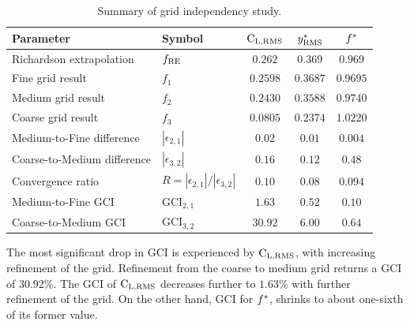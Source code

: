 \documentclass[oneside]{utmthesis}
\begin{document}
\begin{table}[!ht]
\centering
\caption{Summary of grid independency study.} \label{tab:gridIndependency}
\vspace{\baselineskip}
\setlength{\tabcolsep}{10pt}      %
\renewcommand{\arraystretch}{1.5} %
\begin{tabular}{l l c c c}
  \hline
  \hline
Parameter                   & Symbol                                                                  & $\text{C}_{\text{L,RMS}}$ & $y^{*}_{\text{RMS}}$  & $f^{*}$  \\
  \hline
Richardson extrapolation    & $f_{\text{RE}}$                                                                  & $0.262$  & $0.369$  & $0.969$  \\
Fine grid result            & $f_{1}$                                                                 & $0.2598$ & $0.3687$ & $0.9695$ \\
Medium grid result          & $f_{2}$                                                                 & $0.2430$ & $0.3588$ & $0.9740$ \\
Coarse grid result          & $f_{3}$                                                                 & $0.0805$ & $0.2374$ & $1.0220$ \\
Medium-to-Fine difference   & $\left | \epsilon_{2,1} \right |$                                       & $0.02$   & $0.01$   & $0.004$  \\
Coarse-to-Medium difference & $\left | \epsilon_{3,2} \right |$                                       & $0.16$   & $0.12$   & $0.48$   \\
Convergence ratio           & $R = \left | \epsilon_{2,1} \right | / \left | \epsilon_{3,2} \right |$ & $0.10$   & $0.08$   & $0.094$  \\
Medium-to-Fine GCI          & $\text{GCI}_{2,1}$                                                      & $1.63$   & $0.52$   & $0.10$   \\
Coarse-to-Medium GCI        & $\text{GCI}_{3,2}$                                                      & $30.92$  & $6.00$   & $0.64$   \\
  \hline
  \hline
\end{tabular}
\end{table}

The most significant drop in GCI is experienced by $\text{C}_{\text{L,RMS}}$, with increasing refinement of the grid. Refinement from the coarse to medium grid returns a GCI of $30.92\%$. The GCI of $\text{C}_{\text{L,RMS}}$ decreases further to $1.63\%$ with further refinement of the grid. On the other hand, GCI for $f^{*}$, shrinks to about one-sixth of its former value.
\end{document}

